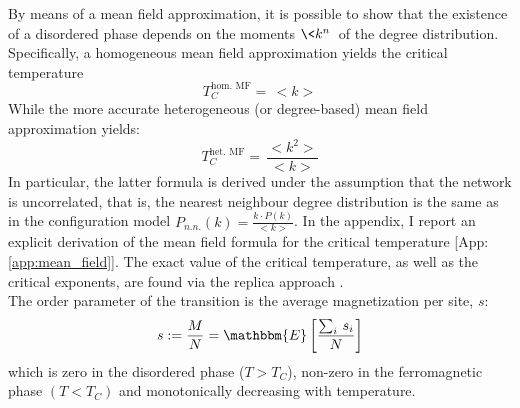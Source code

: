 By means of a mean field approximation, it is possible to show that the existence of a disordered phase depends on the moments $\<k^n\>$ of the degree distribution. Specifically, a homogeneous mean field approximation yields the critical temperature
\begin{equation} \label{eq:hom_mean_field}
    T_C^{\text{hom. MF}} =\,<k>
\end{equation}
While the more accurate heterogeneous (or degree-based) mean field approximation yields:
\begin{equation} \label{eq:het_mean_field}
    T_C^{\text{het. MF}} =\,\frac{<k^2>}{<k>}
\end{equation}
In particular, the latter formula is derived under the assumption that the network is uncorrelated, that is, the nearest neighbour degree distribution is the same as in the configuration model $P_{n.n.} (k)=\frac{k\cdot P(k)}{<k>}$.
In the appendix, I report an explicit derivation of the mean field formula for the critical temperature [App: \ref{app:mean_field}]. The exact value of the critical temperature, as well as the critical exponents, are found via the replica approach \cite{analytical_ising}. \\ 
The order parameter of the transition is the average magnetization per site, $s$:
$$
s := \frac{M}{N} = \mathbbm{E}\left[\frac{\sum_{i}\,s_i}{N}\right]
$$
which is zero in the disordered phase ($T>T_C$), non-zero in the ferromagnetic  phase $(T<T_C)$ and monotonically decreasing with temperature. 

